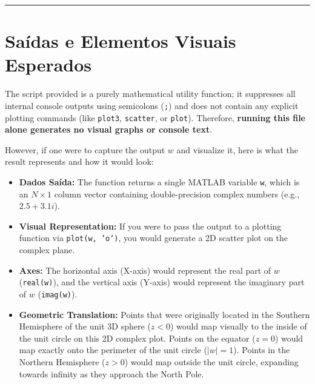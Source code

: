 \vspace{1em}
\hrule
\vspace{1em}

\section{Saídas e Elementos Visuais Esperados}

The script provided is a purely mathematical utility function; it suppresses all internal console outputs using semicolons (\texttt{;}) and does not contain any explicit plotting commands (like \texttt{plot3}, \texttt{scatter}, or \texttt{plot}). Therefore, \textbf{running this file alone generates no visual graphs or console text}. 

However, if one were to capture the output $w$ and visualize it, here is what the result represents and how it would look:

\begin{itemize}
    \item \textbf{Dados Saída:} The function returns a single MATLAB variable \texttt{w}, which is an $N \times 1$ column vector containing double-precision complex numbers (e.g., $2.5 + 3.1i$).
    \item \textbf{Visual Representation:} If you were to pass the output to a plotting function via \texttt{plot(w, 'o')}, you would generate a 2D scatter plot on the complex plane. 
    \item \textbf{Axes:} The horizontal axis (X-axis) would represent the real part of $w$ (\texttt{real(w)}), and the vertical axis (Y-axis) would represent the imaginary part of $w$ (\texttt{imag(w)}).
    \item \textbf{Geometric Translation:} Points that were originally located in the Southern Hemisphere of the unit 3D sphere ($z < 0$) would map visually to the inside of the unit circle on this 2D complex plot. Points on the equator ($z = 0$) would map exactly onto the perimeter of the unit circle ($|w| = 1$). Points in the Northern Hemisphere ($z > 0$) would map outside the unit circle, expanding towards infinity as they approach the North Pole.
\end{itemize}
